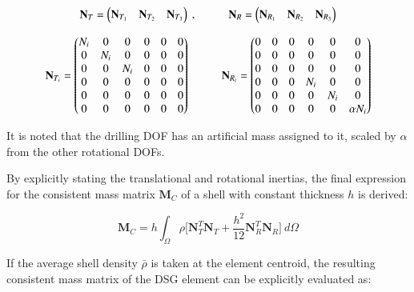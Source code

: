 \begin{equation} 
\mathbf{N}_T = 
\begin{pmatrix}
\mathbf{N}_{T_1} & \mathbf{N}_{T_2} & \mathbf{N}_{T_3}
\end{pmatrix}\ ,
\hspace{10mm}
\mathbf{N}_R = 
\begin{pmatrix}
\mathbf{N}_{R_1} & \mathbf{N}_{R_2} & \mathbf{N}_{R_3}
\end{pmatrix}
\label{eqt17_8}
\end{equation}

\begin{equation} 
\mathbf{N}_{T_i} = 
\begin{pmatrix}
N_i & 0 & 0 & 0 & 0 & 0 \\
0 & N_i & 0 & 0 & 0 & 0 \\
0 & 0 & N_i & 0 & 0 & 0 \\
0 & 0 & 0 & 0 & 0 & 0 \\
0 & 0 & 0 & 0 & 0 & 0 \\
0 & 0 & 0 & 0 & 0 & 0
\end{pmatrix}
\hspace{10mm}
\mathbf{N}_{R_i} = 
\begin{pmatrix}
0 & 0 & 0 & 0 & 0 & 0 \\
0 & 0 & 0 & 0 & 0 & 0 \\
0 & 0 & 0 & 0 & 0 & 0 \\
0 & 0 & 0 & N_i & 0 & 0 \\
0 & 0 & 0 & 0 & N_i & 0 \\
0 & 0 & 0 & 0 & 0 & \alpha N_i
\end{pmatrix}
\label{eqt17_9}
\end{equation}

It is noted that the drilling DOF has an artificial mass assigned to it, scaled by $\alpha$ from the other rotational DOFs.

By explicitly stating the translational and rotational inertias, the final expression for the consistent mass matrix $\mathbf{M}_C$ of a shell with constant thickness $h$ is derived:

\begin{equation} 
\mathbf{M}_C
=
h
\int_{\Omega} 
\rho 
\Big[
\mathbf{N}_T^T
\mathbf{N}_T
+
\frac{h^2}{12}
\mathbf{N}_R^T
\mathbf{N}_R
\Big]
\ d\Omega
\label{eqt17_10}
\end{equation}

If the average shell density $\bar{\rho}$ is taken at the element centroid, the resulting consistent mass matrix of the DSG element can be explicitly evaluated as:

